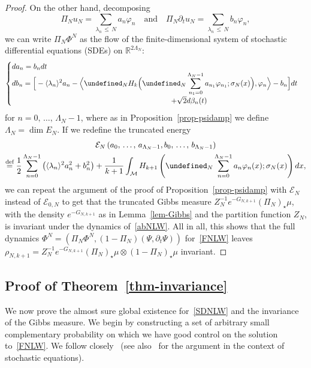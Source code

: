 \documentclass[AHL,Unicode,longabstracts,published]{cedram}
\newcommand{\R}{\mathbb{R}}
\newcommand{\deff}{\overset{\textup{def}}{=}}
\let\P= \undefined
\newcommand{\P}{\mathbf{P}}
\newcommand{\En}{\mathcal{E}}
\newcommand{\M}{\mathcal{M}}
\newcommand{\Ld}{\Lambda}
\newcommand{\s}{\sigma}
\newcommand{\dt}{\partial_t}
\newcommand{\jb}[1] {\langle #1 \rangle}
\begin{document}
\begin{proof}
On the other hand, decomposing
\[
\Pi_Nu_N=\sum_{\lambda_n\,\leq\,N}a_n\varphi_n\quad\text{and}\quad\Pi_N\dt u_N = \sum_{\lambda_n\,\leq\,N}b_n\varphi_n,
\]
we can write $\Pi_N\Phi^N$ as the flow of the finite-dimensional system of stochastic differential equations (SDEs) on $\R^{2\Ld_N}$:
\begin{equation}\label{abNLW}
\begin{cases}
da_n = b_ndt\\
{\displaystyle db_n = \Big[-\jb{\lambda_n}^2a_n - \Big\langle \P_NH_k\Big(\P_N\sum_{n_1=0}^{\Ld_N-1} a_{n_1}\varphi_{n_1};\s_N(x)\Big),\varphi_n\Big\rangle - b_n\Big]dt}\\
\mkern390mu+ \sqrt{2}d\beta_n(t)
\end{cases}
\end{equation}
for $n=0,\,\dots,\,\Ld_N-1$, where as in Proposition~\ref{prop-psidamp} we define $\Ld_N = \dim E_N$. If we redefine the truncated energy
\begin{multline*}
\En_N\left(a_0,\,\dots,\,a_{\Ld_N-1},b_0,\,\dots,\,b_{\Ld_N-1}\right)\\
\deff \frac12\sum_{n=0}^{\Ld_N-1} \left(\jb{\lambda_n}^2a_n^2+b_n^2\right)
 + \frac{1}{k+1}\int_{\M}H_{k+1}\left(\P_N\sum_{n=0}^{\Ld_N-1}a_n\varphi_n(x);\s_N(x)\right)dx,
\end{multline*}
we can repeat the argument of the proof of Proposition~\ref{prop-psidamp} with $\En_N$ instead of $\En_{0,N}$ to get that the truncated Gibbs measure $Z_N^{-1}e^{-G_{N,k+1}}(\Pi_N)_{\star}\mu$, with the density $e^{-G_{N,k+1}}$ as in Lemma~\ref{lem-Gibbs} and the partition function $Z_N$, is invariant under the dynamics of~\eqref{abNLW}. All in all, this shows that the full dynamics $\Phi^N = (\Pi_N\Phi^N,(1-\Pi_N)(\Psi,\dt\Psi))$ for~\eqref{FNLW} leaves $\rho_{N,k+1} = Z_N^{-1}e^{-G_{N,k+1}}(\Pi_N)_\star\mu\otimes(1-\Pi_N)_\star\mu$ invariant.
\end{proof}

\subsection{Proof of Theorem~\ref{thm-invariance}}
We now prove the almost sure global existence for~\eqref{SDNLW} and the invariance of the Gibbs measure. We begin by constructing a set of arbitrary small complementary probability on which we have good control on the solution to~\eqref{FNLW}. We follow closely~\cite{BTT2} (see also~\cite{HM} for the argument in the context of stochastic equations).
\end{document}

